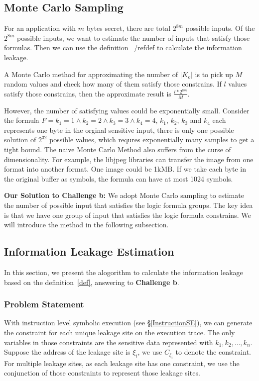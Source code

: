 \subsection{Monte Carlo Sampling}
\label{MCreasons}
For an application with $m$ bytes secret, there are total $2^{8m}$ possible inputs. Of the
$2^{8m}$ possible inputs, we want to estimate the number of inputs that satisfy those formulas.
Then we can use the definition ~/ref{def} to calculate the information leakage.

A Monte Carlo method for approximating the number of $|K_o|$ is to pick up 
$M$ random values and check how many of them satisfy those constrains. If $l$ values
satisfy those constrains, then the approximate result is $\frac{l*2^{8m}}{M}$.

However, the number of satisfying values could be exponentially small. Consider the formula
$F={k_1} = 1\land{k_2} = 2\land{k_3} = 3\land{k_4} = 4$, $k_1$, $k_2$, $k_3$ and $k_4$ each represents
one byte in the orginal sensitive input, there is only one possible solution of $2^{32}$ possible
values, which requres exponentially many samples to get a tight bound. 
The naive Monte Carlo Method also suffers from the curse of dimensionality. For example, 
the libjpeg libraries can transfer the image from one format into another format. One image could
be 1kMB. If we take each byte in the original buffer as symbols, the formula can have at most
1024 symbols. 

\vspace*{6pt}
\textbf{Our Solution to Challenge b:}
We adopt Monte Carlo sampling to estimate the number of possible input
that satisfies the logic formula groups. The key idea is that we have one group of input that satisfies
the logic formula constrains.  We will
introduce the method in the following subsection.


\subsection{Information Leakage Estimation}

\newcommand{\addr}[1]{{l}_{#1}}
\renewcommand{\addr}[1]{{\gamma}_{#1}}
\renewcommand{\addr}[1]{{\zeta}_{#1}}
\renewcommand{\addr}[1]{{\xi}_{#1}}

In this section, we present the alogorithm to calculate the information
leakage based on the definition~\ref{def}, answering to
\textbf{Challenge b}. 

\subsubsection{Problem Statement}
With instruction level symbolic execution (see \S\ref{InstructionSE}), we can generate the constraint 
for each unique leakage site on the execution trace.
The only variables in those constraints are the sensitive data represented
with $k_1, k_2, \ldots , k_n$. Suppose the address of the leakage site is $\addr{i}$,
we use $C_{\addr{i}}$ to denote the constraint. For multiple leakage sites, 
as each leakage site has one constraint, we 
use the conjunction of those constraints to represent those leakage sites. 

